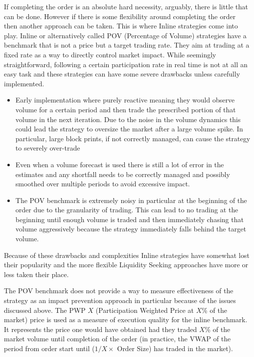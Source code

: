 If completing the order is an absolute hard necessity, arguably, there is little that can be done. However if there is some flexibility around completing the order then another approach can be taken. This is where Inline strategies come into play. Inline or alternatively called POV (Percentage of Volume) strategies have a benchmark that is not a price but a target trading rate. They aim at trading at a fixed rate as a way to directly control market impact. While seemingly straightforward, following a certain participation rate in real time is not at all an easy task and these strategies can have some severe drawbacks unless carefully implemented.


\begin{itemize}
\item Early implementation where purely reactive meaning they would observe volume for a certain period and then trade the prescribed portion of that volume in the next iteration. Due to the noise in the volume dynamics this could lead the strategy to oversize the market after a large volume spike. In particular, large block prints, if not correctly managed, can cause the strategy to severely over-trade

\item Even when a volume forecast is used there is still a lot of error in the estimates and any shortfall needs to be correctly managed and possibly smoothed over multiple periods to avoid excessive impact.

\item The POV benchmark is extremely noisy in particular at the beginning of the order due to the granularity of trading. This can lead to no trading at the beginning until enough volume is traded and then immediately chasing that volume aggressively because the strategy immediately falls behind the target volume.
\end{itemize}


Because of these drawbacks and complexities Inline strategies have somewhat lost their popularity and the more flexible Liquidity Seeking approaches  have more or less taken their place.

The POV benchmark does not provide a way to measure effectiveness of the strategy as an impact prevention approach in particular because of the issues discussed above. The PWP $X$ (Participation Weighted Price at $X$\% of the market) price is used as a measure of execution quality for the inline benchmark. It represents the price one would have obtained had they traded $X$\% of the market volume until completion of the order (in practice, the VWAP of the period from order start until ($1/X \times$ Order Size) has traded in the market). \twomedskip

